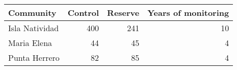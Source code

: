 
\begin{tabular}{lrrr}
\toprule
Community & Control & Reserve & Years of monitoring\\
\midrule
Isla Natividad & 400 & 241 & 10\\
Maria Elena & 44 & 45 & 4\\
Punta Herrero & 82 & 85 & 4\\
\bottomrule
\end{tabular}
